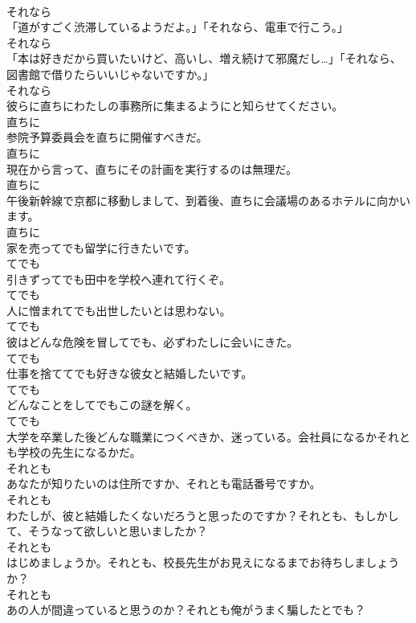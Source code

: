 \documentclass[8pt]{extreport}
\begin{document}
\begin{CJK}{UTF8}{min}
\\	それなら	
\\	「道がすごく渋滞しているようだよ。」「それなら、電車で行こう。」	
\\	それなら	
\\	「本は好きだから買いたいけど、高いし、増え続けて邪魔だし…」「それなら、図書館で借りたらいいじゃないですか。」	
\\	それなら	
\\	彼らに直ちにわたしの事務所に集まるようにと知らせてください。	
\\	直ちに	
\\	参院予算委員会を直ちに開催すべきだ。	
\\	直ちに	
\\	現在から言って、直ちにその計画を実行するのは無理だ。	
\\	直ちに	
\\	午後新幹線で京都に移動しまして、到着後、直ちに会議場のあるホテルに向かいます。	
\\	直ちに	
\\	家を売ってでも留学に行きたいです。	
\\	てでも	
\\	引きずってでも田中を学校へ連れて行くぞ。	
\\	てでも	
\\	人に憎まれてでも出世したいとは思わない。	
\\	てでも	
\\	彼はどんな危険を冒してでも、必ずわたしに会いにきた。	
\\	てでも	
\\	仕事を捨ててでも好きな彼女と結婚したいです。	
\\	てでも	
\\	どんなことをしてでもこの謎を解く。	
\\	てでも	
\\	大学を卒業した後どんな職業につくべきか、迷っている。会社員になるかそれとも学校の先生になるかだ。	
\\	それとも	
\\	あなたが知りたいのは住所ですか、それとも電話番号ですか。	
\\	それとも	
\\	わたしが、彼と結婚したくないだろうと思ったのですか？それとも、もしかして、そうなって欲しいと思いましたか？	
\\	それとも	
\\	はじめましょうか。それとも、校長先生がお見えになるまでお待ちしましょうか？	
\\	それとも	
\\	あの人が間違っていると思うのか？それとも俺がうまく騙したとでも？	

\end{CJK}
\end{document}
